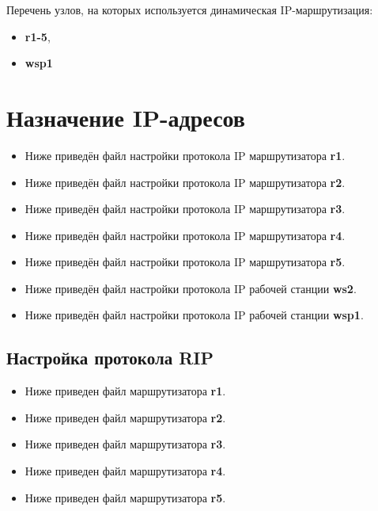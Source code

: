 \documentclass[a4paper,12pt]{article}
\begin{document}
Перечень узлов, на которых используется динамическая IP-маршрутизация: 
\begin{itemize}
  \item \textbf{r1-5},
  \item \textbf{wsp1}
\end{itemize}

\clearpage

\section{Назначение IP-адресов}
\begin{itemize}
\item Ниже приведён файл настройки протокола IP маршрутизатора \textbf{r1}.
\item Ниже приведён файл настройки протокола IP маршрутизатора \textbf{r2}.
\item Ниже приведён файл настройки протокола IP маршрутизатора \textbf{r3}.
\item Ниже приведён файл настройки протокола IP маршрутизатора \textbf{r4}.
\item Ниже приведён файл настройки протокола IP маршрутизатора \textbf{r5}.

\item Ниже приведён файл настройки протокола IP рабочей станции \textbf{ws2}.
\item Ниже приведён файл настройки протокола IP рабочей станции \textbf{wsp1}.
\end{itemize}



\subsection{Настройка протокола RIP}
\begin{itemize}
\item Ниже приведен файл  маршрутизатора \textbf{r1}.
\item Ниже приведен файл  маршрутизатора \textbf{r2}.
\item Ниже приведен файл  маршрутизатора \textbf{r3}.
\item Ниже приведен файл  маршрутизатора \textbf{r4}.
\item Ниже приведен файл  маршрутизатора \textbf{r5}.
\end{itemize}
\end{document}
